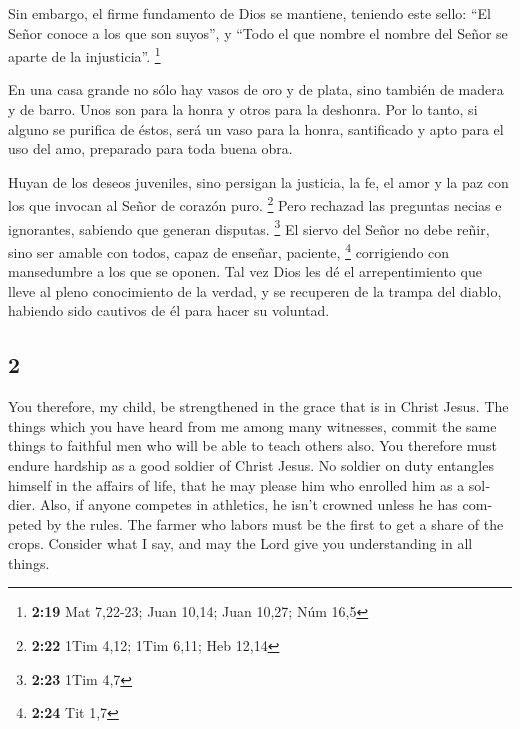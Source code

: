 \begin{paracol}{2}
 Sin embargo, el firme fundamento de Dios se mantiene,
teniendo este sello: ``El Señor conoce a los que son suyos'', y ``Todo
el que nombre el nombre del Señor se aparte de la injusticia''.
\footnote{\textbf{2:19} Mat 7,22-23; Juan 10,14; Juan 10,27; Núm 16,5}

 En una casa grande no sólo hay vasos de oro y de plata,
sino también de madera y de barro. Unos son para la honra y otros para
la deshonra.  Por lo tanto, si alguno se purifica de
éstos, será un vaso para la honra, santificado y apto para el uso del
amo, preparado para toda buena obra.

 Huyan de los deseos juveniles, sino persigan la
justicia, la fe, el amor y la paz con los que invocan al Señor de
corazón puro. \footnote{\textbf{2:22} 1Tim 4,12; 1Tim 6,11; Heb 12,14}
 Pero rechazad las preguntas necias e ignorantes,
sabiendo que generan disputas. \footnote{\textbf{2:23} 1Tim 4,7}
 El siervo del Señor no debe reñir, sino ser amable con
todos, capaz de enseñar, paciente, \footnote{\textbf{2:24} Tit 1,7}
 corrigiendo con mansedumbre a los que se oponen. Tal vez
Dios les dé el arrepentimiento que lleve al pleno conocimiento de la
verdad,  y se recuperen de la trampa del diablo, habiendo
sido cautivos de él para hacer su voluntad.

\switchcolumn
\begin{otherlanguage}{english}

\hypertarget{section-3}{%
\section{2}\label{section-3}}

 You therefore, my child, be strengthened in the grace
that is in Christ Jesus.  The things which you have heard
from me among many witnesses, commit the same things to faithful men who
will be able to teach others also.  You therefore must
endure hardship as a good soldier of Christ Jesus.  No
soldier on duty entangles himself in the affairs of life, that he may
please him who enrolled him as a soldier.  Also, if anyone
competes in athletics, he isn't crowned unless he has competed by the
rules.  The farmer who labors must be the first to get a
share of the crops.  Consider what I say, and may the Lord
give you understanding in all things.


\end{otherlanguage}
\end{paracol}
